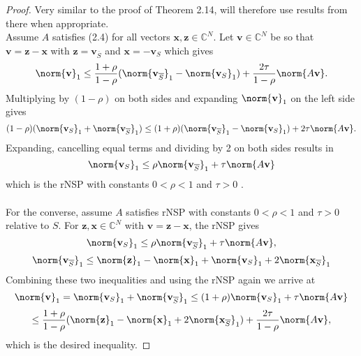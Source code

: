 \begin{proof}
Very similar to the proof of Theorem 2.14, will therefore use results from there when appropriate. 
\\Assume $A$ satisfies (2.4) for all vectors $\mathbf{x,z} \in \mathbb{C}^{N}.$ Let $\mathbf{v} \in \mathbb{C}^{N}$ be so that $\mathbf{v} = \mathbf{z-x}$ with $\mathbf{z} = \mathbf{v}_{\overline{S}}$ and $\mathbf{x} = \mathbf{-v}_S$ which gives
\begin{equation*}
\norm{\mathbf{v}}_1 \leq \frac{1+\rho}{1-\rho}(\norm{ \mathbf{v}_{\overline{S}}}_{1} - \norm{ \mathbf{v}_S}_{1}) + \frac{2\tau}{1-\rho} \norm{A\mathbf{v}}.
\end{equation*}
Multiplying by $(1-\rho)$ on both sides and expanding $\norm{\mathbf{v}}_1$ on the left side gives
\begin{equation*}
(1-\rho)(\norm{\mathbf{v}_S}_1 + \norm{\mathbf{v}_{\overline{S}}}_1) \leq (1+\rho)(\norm{ \mathbf{v}_{\overline{S}}}_{1} - \norm{ \mathbf{v}_S}_{1}) + 2\tau \norm{A\mathbf{v}}.
\end{equation*}
Expanding, cancelling equal terms and dividing by 2 on both sides results in
\begin{equation*}
\norm{ \mathbf{v}_{S}}_{1}  \leq  \rho \norm{ \mathbf{v}_{\overline{S}}}_{1} + \tau \norm{A\mathbf{v}}
\end{equation*}
which is the rNSP with constants $0 < \rho < 1$ and $\tau > 0$ . 
\\\\For the converse, assume $A$ satisfies rNSP with constants $0 < \rho < 1$ and $\tau > 0$ relative to $S$. For $\mathbf{z,x} \in \mathbb{C}^{N}$ with $\mathbf{v = z - x}$, the rNSP gives
\begin{equation*}
\norm{ \mathbf{v}_{S}}_{1}  \leq  \rho \norm{ \mathbf{v}_{\overline{S}}}_{1} + \tau \norm{A\mathbf{v}},
\end{equation*}
\begin{equation*}
\norm{ \mathbf{v}_{\overline{S}}}_{1}   \leq  \norm{\mathbf{z}}_1-\norm{\mathbf{x}}_1+\norm{ \mathbf{v}_{S}}_{1}+2 \norm{\mathbf{x}_{\overline{S}}}_{1}
\end{equation*}
Combining these two inequalities and using the rNSP again we arrive at
\begin{equation*}
\norm{\mathbf{v}}_1 = \norm{\mathbf{v}_S}_1 + \norm{\mathbf{v}_{\overline{S}}}_1 \leq (1+\rho)\norm{\mathbf{v}_S}_1 + \tau \norm{A\mathbf{v}} 
\end{equation*}
\begin{equation*}
\leq \frac{1+\rho}{1-\rho}(\norm{\mathbf{z}}_1-\norm{\mathbf{x}}_1+2 \norm{\mathbf{x}_{\overline{S}}}_{1}) + \frac{2\tau}{1-\rho}\norm{A\mathbf{v}},
\end{equation*}
which is the desired inequality. 


\end{proof}

